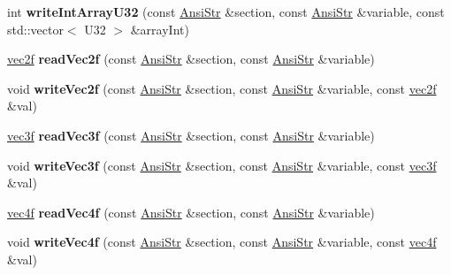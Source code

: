 \begin{DoxyCompactItemize}
\item 
\hypertarget{classps_1_1utils_1_1IniFile_aebc38e8b148acf9c8f8c0881ddf6dd23}{}int {\bfseries write\+Int\+Array\+U32} (const \hyperlink{classps_1_1base_1_1CAString}{Ansi\+Str} \&section, const \hyperlink{classps_1_1base_1_1CAString}{Ansi\+Str} \&variable, const std\+::vector$<$ U32 $>$ \&array\+Int)\label{classps_1_1utils_1_1IniFile_aebc38e8b148acf9c8f8c0881ddf6dd23}

\item 
\hypertarget{classps_1_1utils_1_1IniFile_a7b64f974dbfd820a2c7dac596a91a138}{}\hyperlink{classps_1_1base_1_1Vec2}{vec2f} {\bfseries read\+Vec2f} (const \hyperlink{classps_1_1base_1_1CAString}{Ansi\+Str} \&section, const \hyperlink{classps_1_1base_1_1CAString}{Ansi\+Str} \&variable)\label{classps_1_1utils_1_1IniFile_a7b64f974dbfd820a2c7dac596a91a138}

\item 
\hypertarget{classps_1_1utils_1_1IniFile_a2c3df693b3b71890f5493eb05d8f0dd9}{}void {\bfseries write\+Vec2f} (const \hyperlink{classps_1_1base_1_1CAString}{Ansi\+Str} \&section, const \hyperlink{classps_1_1base_1_1CAString}{Ansi\+Str} \&variable, const \hyperlink{classps_1_1base_1_1Vec2}{vec2f} \&val)\label{classps_1_1utils_1_1IniFile_a2c3df693b3b71890f5493eb05d8f0dd9}

\item 
\hypertarget{classps_1_1utils_1_1IniFile_a51a68ba0787d7f43124e5f7cd1aba1cb}{}\hyperlink{classps_1_1base_1_1Vec3}{vec3f} {\bfseries read\+Vec3f} (const \hyperlink{classps_1_1base_1_1CAString}{Ansi\+Str} \&section, const \hyperlink{classps_1_1base_1_1CAString}{Ansi\+Str} \&variable)\label{classps_1_1utils_1_1IniFile_a51a68ba0787d7f43124e5f7cd1aba1cb}

\item 
\hypertarget{classps_1_1utils_1_1IniFile_ab2ae618c766ce2e9a38a4e0679018f62}{}void {\bfseries write\+Vec3f} (const \hyperlink{classps_1_1base_1_1CAString}{Ansi\+Str} \&section, const \hyperlink{classps_1_1base_1_1CAString}{Ansi\+Str} \&variable, const \hyperlink{classps_1_1base_1_1Vec3}{vec3f} \&val)\label{classps_1_1utils_1_1IniFile_ab2ae618c766ce2e9a38a4e0679018f62}

\item 
\hypertarget{classps_1_1utils_1_1IniFile_a6dd96db96d4b9be19c2404bf91ad2d83}{}\hyperlink{classps_1_1base_1_1Vec4}{vec4f} {\bfseries read\+Vec4f} (const \hyperlink{classps_1_1base_1_1CAString}{Ansi\+Str} \&section, const \hyperlink{classps_1_1base_1_1CAString}{Ansi\+Str} \&variable)\label{classps_1_1utils_1_1IniFile_a6dd96db96d4b9be19c2404bf91ad2d83}

\item 
\hypertarget{classps_1_1utils_1_1IniFile_a078a704b08b9f4f259076a5595641fc2}{}void {\bfseries write\+Vec4f} (const \hyperlink{classps_1_1base_1_1CAString}{Ansi\+Str} \&section, const \hyperlink{classps_1_1base_1_1CAString}{Ansi\+Str} \&variable, const \hyperlink{classps_1_1base_1_1Vec4}{vec4f} \&val)\label{classps_1_1utils_1_1IniFile_a078a704b08b9f4f259076a5595641fc2}

\end{DoxyCompactItemize}
